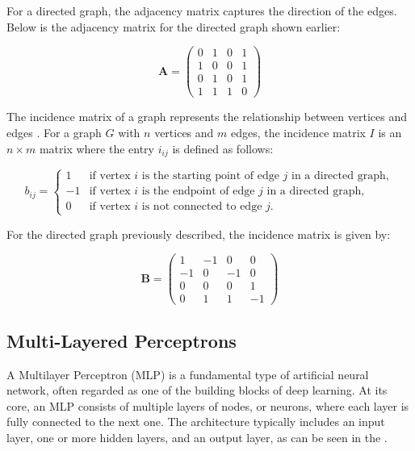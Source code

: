 For a directed graph, the adjacency matrix captures the direction of the edges. Below is the adjacency matrix for the directed graph shown earlier:

\[
\mathbf{A} = \begin{pmatrix}
0 & 1 & 0 & 1 \\
1 & 0 & 0 & 1 \\
0 & 1 & 0 & 1 \\
1 & 1 & 1 & 0
\end{pmatrix}
\]


The incidence matrix of a graph represents the relationship between vertices and edges \cite{wilson_1972}. For a graph $G$ with $n$ vertices and $m$ edges, the incidence matrix $I$ is an $n \times m$ matrix where the entry $i_{ij}$ is defined as follows:

\begin{equation}
 b_{ij} =
\begin{cases}
1 & \text{if vertex } i \text{ is the starting point of edge } j \text{ in a directed graph}, \\
-1 & \text{if vertex } i \text{ is the endpoint of edge } j \text{ in a directed graph}, \\
0 & \text{if vertex } i \text{ is not connected to edge } j.
\end{cases}  
    \label{eq:incidence_matrix_definition}
\end{equation}


For the directed graph previously described, the incidence matrix is given by:

\[
\mathbf{B} = \begin{pmatrix}
1 & -1 & 0 & 0 \\
-1 & 0 & -1 & 0 \\
0 & 0 & 0 & 1  \\
0 & 1 & 1 & -1 
\end{pmatrix}
\]

\subsection{Multi-Layered Perceptrons}

A Multilayer Perceptron (MLP) is a fundamental type of artificial neural network, often regarded as one of the building blocks of deep learning. At its core, an MLP consists of multiple layers of nodes, or neurons, where each layer is fully connected to the next one. The architecture typically includes an input layer, one or more hidden layers, and an output layer, as can be seen in the .


